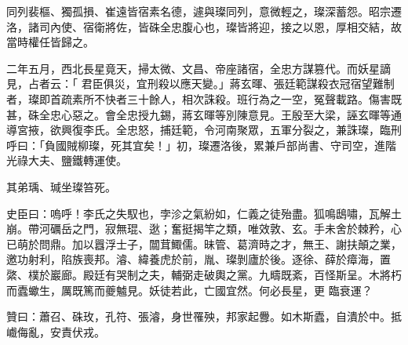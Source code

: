 \begin{pinyinscope}
 同列裴樞、獨孤損、崔遠皆宿素名德，遽與璨同列，意微輕之，璨深蓄怨。昭宗遷洛，諸司內使、宿衛將佐，皆硃全忠腹心也，璨皆將迎，接之以恩，厚相交結，故當時權任皆歸之。



 二年五月，西北長星竟天，掃太微、文昌、帝座諸宿，全忠方謀篡代。而妖星謫見，占者云：「
 君臣俱災，宜刑殺以應天變。」蔣玄暉、張廷範謀殺衣冠宿望難制者，璨即首疏素所不快者三十餘人，相次誅殺。班行為之一空，冤聲載路。傷害既甚，硃全忠心惡之。會全忠授九錫，蔣玄暉等別陳意見。王殷至大梁，誣玄暉等通導宮掖，欲興復李氏。全忠怒，捕廷範，令河南聚眾，五軍分裂之，兼誅璨，臨刑呼曰：「負國賊柳璨，死其宜矣！」初，璨遷洛後，累兼戶部尚書、守司空，進階光祿大夫、鹽鐵轉運使。



 其弟瑀、瑊坐璨笞死。



 史臣曰：嗚呼！李氏之失馭也，孛沴之氣紛如，仁義之徒殆盡。狐鳴鴟嘯，瓦解土崩。帶河礪岳之門，寂無琨、逖；奮挺揭竿之類，唯效敦、玄。手未舍於棘矜，心已萌於問鼎。加以囂浮士子，闒茸鯫儒。昧管、葛濟時之才，無王、謝扶顛之業，邀功射利，陷族喪邦。濬、緯養虎於前，胤、璨剝廬於後。逐徐、薛於瘴海，置綮、樸於巖廊。殿廷有哭制之夫，輔弼走破輿之黨。九疇既紊，百怪斯呈。木將朽而蠹蠍生，厲既篤而夔魖見。妖徒若此，亡國宜然。何必長星，更
 臨衰運？



 贊曰：蕭召、硃玫，孔符、張濬，身世罹殃，邦家起釁。如木斯蠹，自潰於中。抵巇侮亂，安責伏戎。



\end{pinyinscope}
